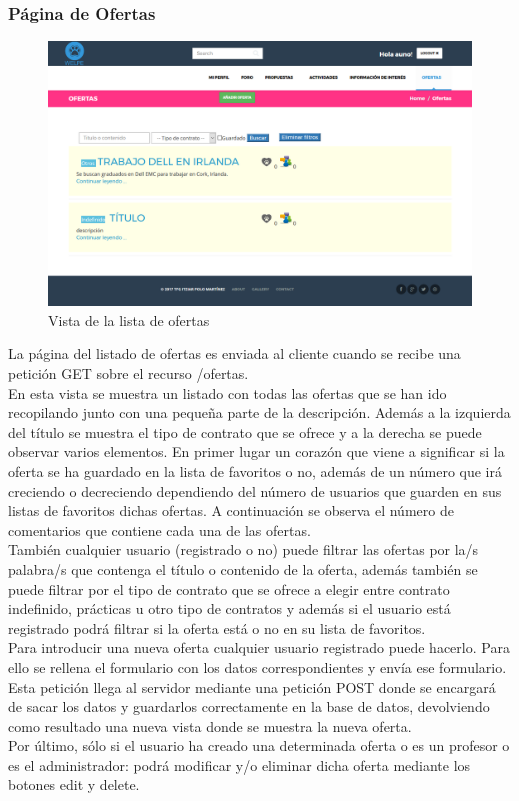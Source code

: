 \subsubsection{Página de Ofertas}
\label{subsubsec:ofertas}
\begin{figure}[H]
\centering
\includegraphics[width=12cm]{img/ofertas}
\caption{Vista de la lista de ofertas}
\label{figura:ofertas}
\end{figure}
La página del listado de ofertas es enviada al cliente cuando se recibe una petición GET sobre el recurso /ofertas.\\
En esta vista se muestra un listado con todas las ofertas que se han ido recopilando junto con una pequeña parte de la descripción. Además a la izquierda del título se muestra el tipo de contrato que se ofrece y a la derecha se puede observar varios elementos. En primer lugar un corazón que viene a significar si la oferta se ha guardado en la lista de favoritos o no, además de un número que irá creciendo o decreciendo dependiendo del número de usuarios que guarden en sus listas de favoritos dichas ofertas. A continuación se observa el número de comentarios que contiene cada una de las ofertas.\\
También cualquier usuario (registrado o no) puede filtrar las ofertas por la/s palabra/s que contenga el título o contenido de la oferta, además también se puede filtrar por el tipo de contrato que se ofrece a elegir entre contrato indefinido, prácticas u otro tipo de contratos y además si el usuario está registrado podrá filtrar si la oferta está o no en su lista de favoritos.\\
Para introducir una nueva oferta cualquier usuario registrado puede hacerlo. Para ello se rellena el formulario con los datos correspondientes y envía ese formulario. Esta petición llega al servidor mediante una petición POST donde se encargará de sacar los datos y guardarlos correctamente en la base de datos, devolviendo como resultado una nueva vista donde se muestra la nueva oferta.\\
Por último, sólo si el usuario ha creado una determinada oferta o es un profesor o es el administrador: podrá modificar y/o eliminar dicha oferta mediante los botones edit y delete.


